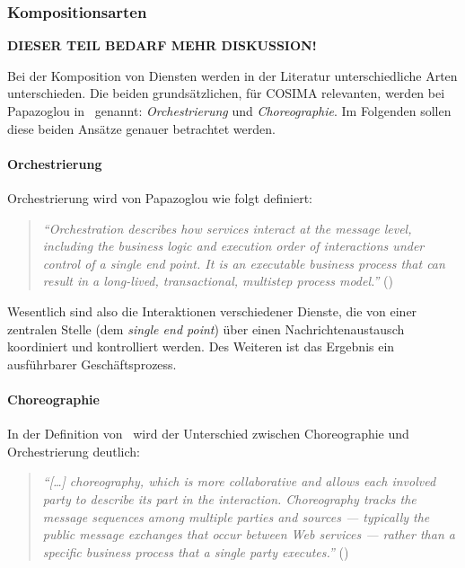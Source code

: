 \subsubsection{Kompositionsarten} %
\label{ssub:kompositionsarten}

  \textbf{DIESER TEIL BEDARF MEHR DISKUSSION!}

  Bei der Komposition von Diensten werden in der Literatur unterschiedliche Arten unterschieden. Die beiden grundsätzlichen, für COSIMA relevanten, werden bei Papazoglou in~\citep[S. 41]{papazoglou2007soc} genannt: \emph{Orchestrierung} und \emph{Choreographie}. Im Folgenden sollen diese beiden Ansätze genauer betrachtet werden.
  
\paragraph{Orchestrierung} %
\label{par:orchestrierung}
  
  Orchestrierung wird von Papazoglou wie folgt definiert:
  
  \begin{quote}
    \emph{"`Orchestration describes how services interact at the message level, including the business logic and execution order of interactions under control of a single end point. It is an executable business process that can result in a long-lived, transactional, multistep process model."'} (\citep[S. 41]{papazoglou2007soc})
  \end{quote}
  
  Wesentlich sind also die Interaktionen verschiedener Dienste, die von einer zentralen Stelle (dem \emph{single end point}) über einen Nachrichtenaustausch koordiniert und kontrolliert werden. Des Weiteren ist das Ergebnis ein ausführbarer Geschäftsprozess.


\paragraph{Choreographie} %
\label{par:choreographie}

  In der Definition von~\citep{peltz2003wso} wird der Unterschied zwischen Choreographie und Orchestrierung deutlich:
  
  \begin{quote}
    \emph{"`[\ldots] choreography, which is more collaborative and allows each involved party to describe its part in the interaction. Choreography tracks the message sequences among multiple parties and sources --- typically the public message exchanges that occur between Web services --- rather than a specific business process that a single party executes."'} (\citep[S. 46]{peltz2003wso})
  \end{quote}

